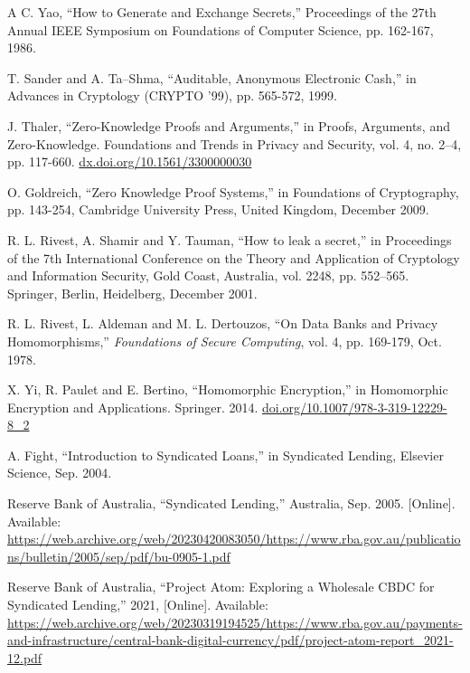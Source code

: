 \begin{enumerate}[leftmargin=0.75cm,label={[\arabic*]}]
  \item A C. Yao, ``How to Generate and Exchange Secrets,'' Proceedings of the 27th Annual IEEE Symposium on Foundations of Computer Science, pp. 162-167, 1986.

  \item T. Sander and A. Ta–Shma, ``Auditable, Anonymous Electronic Cash,'' in Advances in Cryptology (CRYPTO '99), pp. 565-572, 1999. 

  \item J. Thaler, ``Zero-Knowledge Proofs and Arguments,'' in Proofs, Arguments, and Zero-Knowledge. Foundations and Trends in Privacy and Security, vol. 4, no. 2–4, pp. 117-660. \url{dx.doi.org/10.1561/3300000030}

  \item O. Goldreich, ``Zero Knowledge Proof Systems,'' in Foundations of Cryptography, pp. 143-254, Cambridge University Press, United Kingdom, December 2009.

  \item R. L. Rivest, A. Shamir and Y. Tauman, ``How to leak a secret,'' in Proceedings of the 7th International Conference on the Theory and Application of Cryptology and Information Security, Gold Coast, Australia, vol. 2248, pp. 552–565. Springer, Berlin, Heidelberg, December 2001.

  \item R. L. Rivest, L. Aldeman and M. L. Dertouzos, ``On Data Banks and Privacy Homomorphisms,'' \textit{Foundations of Secure Computing}, vol. 4, pp. 169-179, Oct. 1978.

  \item X. Yi, R. Paulet and E. Bertino, ``Homomorphic Encryption,'' in Homomorphic Encryption and Applications. Springer. 2014. \url{doi.org/10.1007/978-3-319-12229-8_2}


  \item A. Fight, ``Introduction to Syndicated Loans,'' in Syndicated Lending, Elsevier Science, Sep. 2004. 

  \item Reserve Bank of Australia, ``Syndicated Lending,'' Australia, Sep. 2005. [Online]. Available: \url{https://web.archive.org/web/20230420083050/https://www.rba.gov.au/publications/bulletin/2005/sep/pdf/bu-0905-1.pdf}
  
  \item Reserve Bank of Australia, ``Project Atom: Exploring a Wholesale CBDC for Syndicated Lending,'' 2021, [Online]. Available: \url{https://web.archive.org/web/20230319194525/https://www.rba.gov.au/payments-and-infrastructure/central-bank-digital-currency/pdf/project-atom-report_2021-12.pdf}


\end{enumerate}
